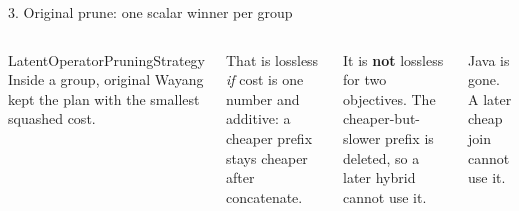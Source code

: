 \documentclass[aspectratio=169,11pt]{beamer}
\begin{document}
\begin{frame}{3. Original prune: one scalar winner per group}

\begin{columns}[c]
\begin{block}{LatentOperatorPruningStrategy}
Inside a group, original Wayang kept the plan with the smallest squashed cost.
\end{block}
\vspace{0.25cm}
{\small
That is lossless \emph{if} cost is one number and additive: a cheaper prefix stays cheaper after concatenate.

\vspace{0.15cm}
It is \textbf{not} lossless for two objectives. The cheaper-but-slower prefix is deleted, so a later hybrid cannot use it.}
\centering
{}

\vspace{0.1cm}
{\scriptsize\color{maroon} Java is gone. A later cheap join cannot use it.}
\end{columns}
\end{frame}
\end{document}
